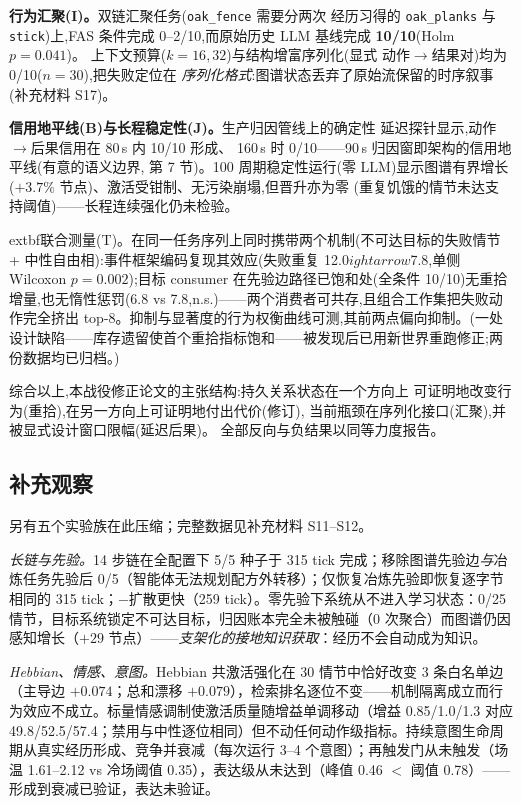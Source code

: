 \documentclass[10pt,a4paper]{ctexart}
\begin{document}
\textbf{行为汇聚(I)。}双链汇聚任务(\texttt{oak\_fence} 需要分两次
经历习得的 \texttt{oak\_planks} 与 \texttt{stick})上,FAS 条件完成
0--2/10,而原始历史 LLM 基线完成 \textbf{10/10}(Holm $p{=}0.041$)。
上下文预算($k{=}16,32$)与结构增富序列化(显式
动作$\rightarrow$结果对)均为 0/10($n{=}30$),把失败定位在
\emph{序列化格式}:图谱状态丢弃了原始流保留的时序叙事
(补充材料 S17)。

\textbf{信用地平线(B)与长程稳定性(J)。}生产归因管线上的确定性
延迟探针显示,动作$\rightarrow$后果信用在 80\,s 内 10/10 形成、
160\,s 时 0/10——90\,s 归因窗即架构的信用地平线(有意的语义边界,
第 7 节)。100 周期稳定性运行(零 LLM)显示图谱有界增长
($+3.7\%$ 节点)、激活受钳制、无污染崩塌,但晋升亦为零
(重复饥饿的情节未达支持阈值)——长程连续强化仍未检验。

	extbf{联合测量(T)。}在同一任务序列上同时携带两个机制(不可达目标的失败情节 + 中性自由相):事件框架编码复现其效应(失败重复 12.0$
ightarrow$7.8,单侧 Wilcoxon $p{=}0.002$);目标 consumer 在先验边路径已饱和处(全条件 10/10)无重拾增量,也无惰性惩罚(6.8 vs 7.8,n.s.)——两个消费者可共存,且组合工作集把失败动作完全挤出 top-8。抑制与显著度的行为权衡曲线可测,其前两点偏向抑制。(一处设计缺陷——库存遗留使首个重拾指标饱和——被发现后已用新世界重跑修正;两份数据均已归档。)

综合以上,本战役修正论文的主张结构:持久关系状态在一个方向上
可证明地改变行为(重拾),在另一方向上可证明地付出代价(修订),
当前瓶颈在序列化接口(汇聚),并被显式设计窗口限幅(延迟后果)。
全部反向与负结果以同等力度报告。

\subsection{补充观察}
\label{sec:res-system}
另有五个实验族在此压缩；完整数据见补充材料 S11--S12。

\emph{长链与先验。}14 步链在全配置下 5/5 种子于 315 tick 完成；移除图谱先验边\emph{与}冶炼任务先验后 0/5（智能体无法规划配方外转移）；仅恢复冶炼先验即恢复逐字节相同的 315 tick；$-$扩散更快（259 tick）。零先验下系统从不进入学习状态：0/25 情节，目标系统锁定不可达目标，归因账本完全未被触碰（0 次聚合）而图谱仍因感知增长（$+29$ 节点）——\emph{支架化的接地知识获取}：经历不会自动成为知识。

\emph{Hebbian、情感、意图。}Hebbian 共激活强化在 30 情节中恰好改变 3 条白名单边（主导边 $+0.074$；总和漂移 $+0.079$），检索排名逐位不变——机制隔离成立而行为效应不成立。标量情感调制使激活质量随增益单调移动（增益 0.85/1.0/1.3 对应 49.8/52.5/57.4；禁用与中性逐位相同）但不动任何动作级指标。持续意图生命周期从真实经历形成、竞争并衰减（每次运行 3--4 个意图）；再触发门从未触发（场温 1.61--2.12 vs 冷场阈值 0.35），表达级从未达到（峰值 0.46 $<$ 阈值 0.78）——形成到衰减已验证，表达未验证。
\end{document}

